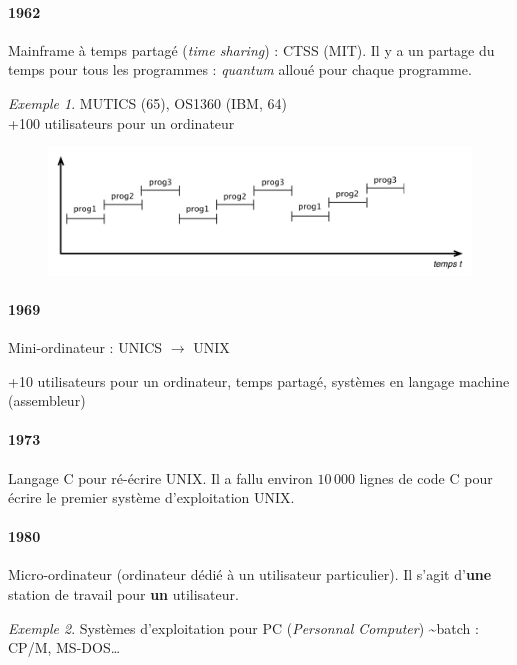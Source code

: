 \documentclass[11pt,english,french]{scrreprt}
\theoremstyle{remark}
\newtheorem*{ex*}{Exemple}
\theoremstyle{definition}
\begin{document}
\paragraph{1962} %
Mainframe à temps partagé (\emph{time sharing}) : CTSS (MIT). Il y a un partage du temps pour tous les programmes : \emph{quantum} alloué pour chaque programme.

\begin{ex*}
	MUTICS (65), OS1360 (IBM, 64)\\
	+100 utilisateurs pour un ordinateur
\end{ex*}

\begin{figure}[h!]
	\center
	\includegraphics[scale=.6]{img/split-time}
\end{figure}

\paragraph{1969} %
Mini-ordinateur : UNICS $\rightarrow$ UNIX

+10 utilisateurs pour un ordinateur, temps partagé, systèmes en langage machine (assembleur)

\paragraph{1973} %
Langage C pour ré-écrire UNIX. Il a fallu environ $10\,000$ lignes de code C pour écrire le premier système d'exploitation UNIX.

\paragraph{1980} %
Micro-ordinateur (ordinateur dédié à un utilisateur particulier). Il s'agit d'\textbf{une} station de travail pour \textbf{un} utilisateur. 
\begin{ex*}
	Systèmes d'exploitation pour PC (\emph{Personnal Computer}) \textasciitilde batch : CP/M, MS-DOS\dots
\end{ex*}
\end{document}
